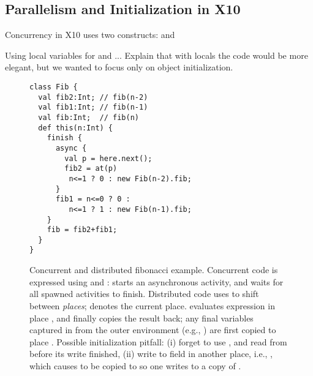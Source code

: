 \subsection{Parallelism and Initialization in X10}
\label{Section:Parallelism}

Concurrency in X10 uses two constructs:
 and 

Using local variables for  and  ...
Explain that with locals the code would be more elegant,
    but we wanted to focus only on object initialization.



\begin{figure}
\begin{lstlisting}
class Fib {
  val fib2:Int; // fib(n-2)
  val fib1:Int; // fib(n-1)
  val fib:Int;  // fib(n)
  def this(n:Int) {
    finish {
      async {
        val p = here.next();
        fib2 = at(p)
         n<=1 ? 0 : new Fib(n-2).fib;
      }
      fib1 = n<=0 ? 0 :
         n<=1 ? 1 : new Fib(n-1).fib;
    }
    fib = fib2+fib1;
  }
}
\end{lstlisting}
\caption{Concurrent and distributed fibonacci example.
    Concurrent code is expressed using  and :
         starts an asynchronous activity,
        and  waits for all spawned activities to finish.
    Distributed code uses  to shift between
        \emph{places};
         denotes the current place.
     evaluates expression 
        in place , and finally copies the result back;
        any final variables captured in  from
        the outer environment (e.g., )
        are first copied to place .
    Possible initialization pitfall:
        (i) %
            forget to use ,
            and read from  before its write finished,
        (ii) %
            write to field  in another place, i.e.,
            ,
            which causes \this to be copied to 
            so one writes to a copy of \this.
    }
\label{Figure:DistributedFib}
\end{figure}


